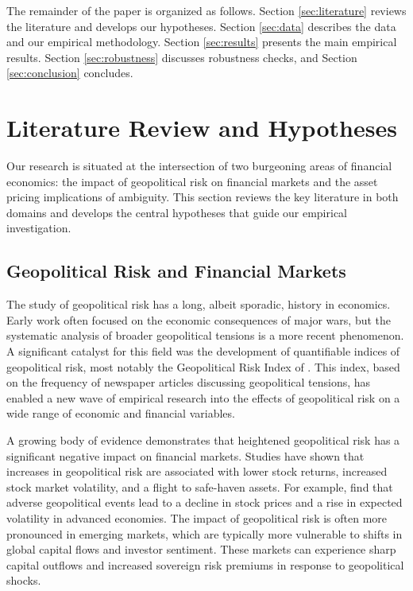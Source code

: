 \documentclass[preprint,12pt,authoryear]{elsarticle}
\begin{document}
The remainder of the paper is organized as follows. Section \ref{sec:literature} reviews the literature and develops our hypotheses. Section \ref{sec:data} describes the data and our empirical methodology. Section \ref{sec:results} presents the main empirical results. Section \ref{sec:robustness} discusses robustness checks, and Section \ref{sec:conclusion} concludes.

\section{Literature Review and Hypotheses}

Our research is situated at the intersection of two burgeoning areas of financial economics: the impact of geopolitical risk on financial markets and the asset pricing implications of ambiguity. This section reviews the key literature in both domains and develops the central hypotheses that guide our empirical investigation.

\subsection{Geopolitical Risk and Financial Markets}

The study of geopolitical risk has a long, albeit sporadic, history in economics. Early work often focused on the economic consequences of major wars, but the systematic analysis of broader geopolitical tensions is a more recent phenomenon. A significant catalyst for this field was the development of quantifiable indices of geopolitical risk, most notably the Geopolitical Risk Index of \citet{caldara2022measuring}. This index, based on the frequency of newspaper articles discussing geopolitical tensions, has enabled a new wave of empirical research into the effects of geopolitical risk on a wide range of economic and financial variables.

A growing body of evidence demonstrates that heightened geopolitical risk has a significant negative impact on financial markets. Studies have shown that increases in geopolitical risk are associated with lower stock returns, increased stock market volatility, and a flight to safe-haven assets. For example, \citet{caldara2022measuring} find that adverse geopolitical events lead to a decline in stock prices and a rise in expected volatility in advanced economies. The impact of geopolitical risk is often more pronounced in emerging markets, which are typically more vulnerable to shifts in global capital flows and investor sentiment. These markets can experience sharp capital outflows and increased sovereign risk premiums in response to geopolitical shocks.
\end{document}
